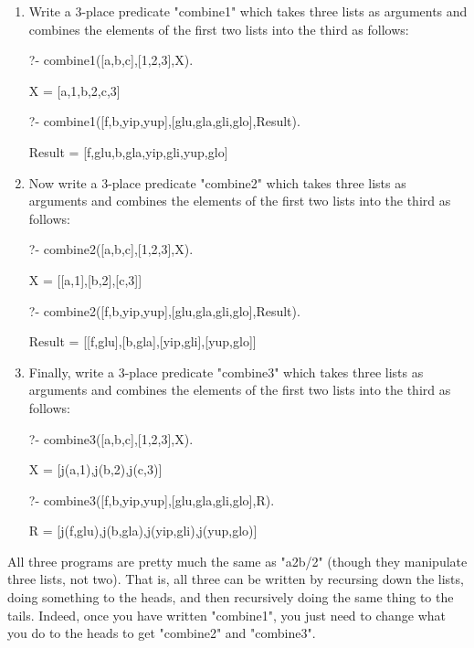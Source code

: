 \begin{enumerate}
\item{}Write a 3-place predicate "combine1" which takes three
lists as arguments and combines the elements of the first two lists
into the third as follows:
\begin{LPNcodedisplay}
?- combine1([a,b,c],[1,2,3],X).

X = [a,1,b,2,c,3]

?- combine1([f,b,yip,yup],[glu,gla,gli,glo],Result).

Result = [f,glu,b,gla,yip,gli,yup,glo]
\end{LPNcodedisplay}

\item{}Now write a 3-place predicate "combine2" which takes three
lists as arguments and combines the elements of the first two lists
into the third as follows:
\begin{LPNcodedisplay}
?- combine2([a,b,c],[1,2,3],X).

X = [[a,1],[b,2],[c,3]]

?- combine2([f,b,yip,yup],[glu,gla,gli,glo],Result).

Result = [[f,glu],[b,gla],[yip,gli],[yup,glo]]
\end{LPNcodedisplay}

\item{}Finally, write a 3-place predicate "combine3" which takes
three lists as arguments and combines the elements of the first two lists
into the third as follows:
\begin{LPNcodedisplay}
?- combine3([a,b,c],[1,2,3],X).

X = [j(a,1),j(b,2),j(c,3)]

?- combine3([f,b,yip,yup],[glu,gla,gli,glo],R).

R = [j(f,glu),j(b,gla),j(yip,gli),j(yup,glo)]
\end{LPNcodedisplay}

\end{enumerate}

All three programs are pretty much the same as "a2b/2" (though they
manipulate three lists, not two).  That is, all three can be written
by recursing down the lists, doing something to the heads, and then
recursively doing the same thing to the tails.  Indeed, once you have
written "combine1", you just need to change what you do to the heads
to get "combine2" and "combine3".

